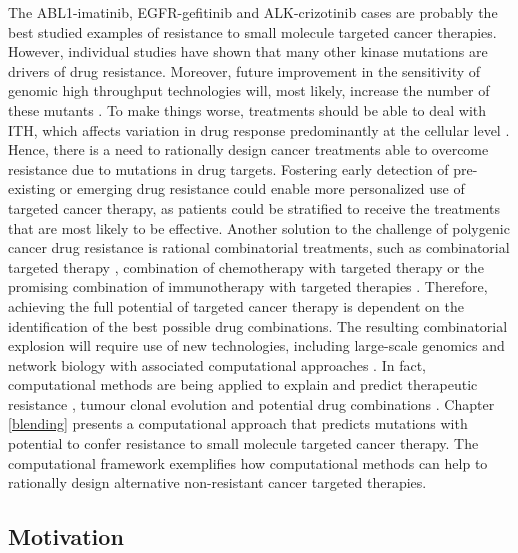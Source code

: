 \documentclass[11pt, b5paper,twoside]{tesi_upf}
\begin{document}
\par The ABL1-imatinib, EGFR-gefitinib and ALK-crizotinib cases are probably the best studied examples of resistance to small molecule targeted cancer therapies. However, individual studies have shown that many other kinase mutations are drivers of drug resistance. Moreover, future improvement in the sensitivity of genomic high throughput technologies will, most likely, increase the number of these mutants \cite{Schmitt2015}. To make things worse, treatments should be able to deal with ITH, which affects variation in drug response predominantly at the cellular level \cite{Burrell2014}. Hence, there is a need to rationally design cancer treatments able to overcome resistance due to mutations in drug targets. Fostering early detection of pre-existing or emerging drug resistance could enable more personalized use of targeted cancer therapy, as patients could be stratified to receive the treatments that are most likely to be effective. Another solution to the challenge of polygenic cancer drug resistance is rational combinatorial treatments, such as combinatorial targeted therapy \cite{Flaherty2012}, combination of chemotherapy with targeted therapy \cite{Cortes2016} or the promising combination of immunotherapy with targeted therapies \cite{Vanneman2012, Ribas2013}. Therefore, achieving the full potential of targeted cancer therapy is dependent on the identification of the best possible drug combinations. The resulting combinatorial explosion will require use of new technologies, including large-scale genomics and network biology with associated computational approaches \cite{Al-Lazikani2012}. In fact, computational methods are being applied to explain and predict therapeutic resistance \cite{Bozic2013, Komarova2014}, tumour clonal evolution \cite{Williams2016, Attolini2010} and potential drug combinations \cite{Chmielecki2011, Huang2007}. Chapter \ref{blending} presents a computational approach that predicts mutations with potential to confer resistance to small molecule targeted cancer therapy. The computational framework exemplifies how computational methods can help to rationally design alternative non-resistant cancer targeted therapies. 

 
\subsection{Motivation}
\end{document}

